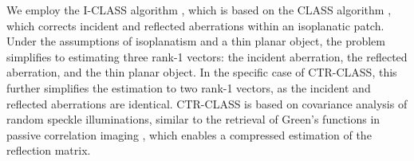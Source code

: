 \documentclass[12pt]{article}
\newenvironment{ourresponse}
    {\begin{tcolorbox}[width=\linewidth,breakable,enhanced,colback=gray!5,colframe=responsecolor!50,title=Response,left=5pt,right=5pt]}
    {\end{tcolorbox}}
\begin{document}
\begin{enumerate}[label=\arabic*.]
\begin{ourresponse}

        

        We employ the I-CLASS algorithm \cite{weinberg2023noninvasive}, which is based on the CLASS algorithm \cite{kang17, kang2024implementation}, which corrects incident and reflected aberrations within an isoplanatic patch. Under the assumptions of isoplanatism and a thin planar object, the problem simplifies to estimating three rank-1 vectors: the incident aberration, the reflected aberration, and the thin planar object. In the specific case of CTR-CLASS, this further simplifies the estimation to two rank-1 vectors, as the incident and reflected aberrations are identical. CTR-CLASS is based on covariance analysis of random speckle illuminations, similar to the retrieval of Green's functions in passive correlation imaging \cite{wapenaar2004retrieving}, which enables a compressed estimation of the reflection matrix.


\end{ourresponse}
\end{enumerate}
\end{document}
